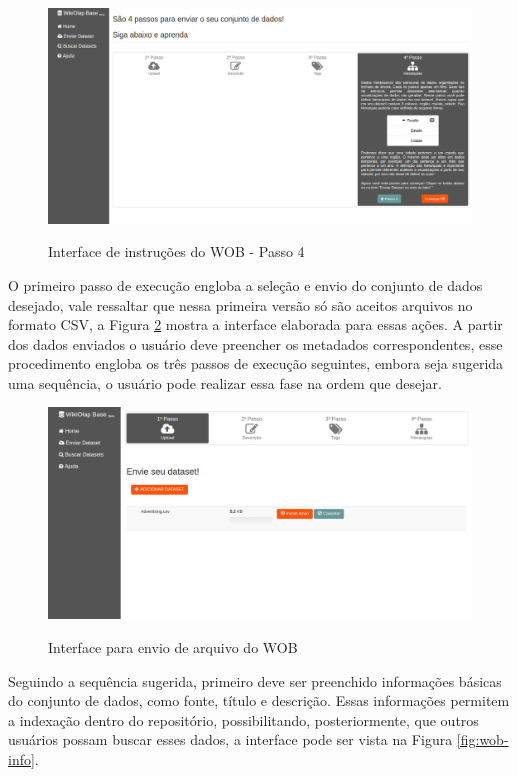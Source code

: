 \begin{figure}[!htb]
    \centering
    \caption{Interface de instruções do WOB - Passo 4}
    \includegraphics[width=1\textwidth]{./04-figuras/wob-ajuda4}
    \label{fig:wob-ajuda4}
\end{figure}

O primeiro passo de execução engloba a seleção e envio do conjunto de dados desejado, vale
ressaltar que nessa primeira versão só são aceitos arquivos no formato CSV, a Figura \ref{fig:wob-sendfile} 
mostra a interface elaborada para essas ações. A partir dos dados enviados o usuário deve 
preencher os metadados correspondentes, esse procedimento engloba os três passos de execução 
seguintes, embora seja sugerida uma sequência, o usuário pode realizar essa fase na ordem 
que desejar. 

\begin{figure}[!htb]
    \centering
    \caption{Interface para envio de arquivo do WOB}
    \includegraphics[width=1\textwidth]{./04-figuras/wob-sendfile}
    \label{fig:wob-sendfile}
\end{figure}

Seguindo a sequência sugerida, primeiro deve ser preenchido informações básicas do conjunto 
de dados, como fonte, título e descrição. Essas informações permitem a indexação dentro do 
repositório, possibilitando, posteriormente, que outros usuários possam buscar esses dados, 
a interface pode ser vista na Figura \ref{fig:wob-info}.

